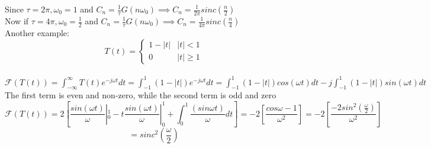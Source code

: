 \documentclass[11pt]{article}
\theoremstyle{definition}
\begin{document}
Since $\tau = 2\pi, \omega_0 = 1$ and $C_n = \frac{1}{\tau}G(n\omega_0) \implies C_n = \frac{1}{2\pi}sinc(\frac{n}{2})$\\
Now if  $\tau = 4\pi, \omega_0 = \frac{1}{2}$ and $C_n = \frac{1}{\tau}G(n\omega_0) \implies C_n = \frac{1}{4\pi}sinc(\frac{n}{4})$\\

Another example:
\[T(t) =  \begin{cases} 
      1-|t| & |t| < 1 \\
      0 & |t| \geq 1
   \end{cases}
\]\\
$\mathcal{F}(T(t)) = \int_{-\infty}^{\infty}T(t) e^{-j\omega t}dt = \int_{-1}^{1}(1-|t|) e^{-j\omega t}dt = \int_{-1}^{1}(1-|t|) cos(\omega t)dt - j\int_{-1}^{1}(1-|t|) sin(\omega t)dt$
The first term is even and non-zero, while the second term is odd and zero
$$\mathcal{F}(T(t)) = 2[\frac{sin(\omega t)}{\omega}|^1_0 -t\frac{sin(\omega t)}{\omega}|^1_0 + \int^1_0\frac{(sin\omega t)}{\omega}dt] = -2[\frac{cos\omega - 1 }{\omega^2}] = -2[\frac{-2sin^2(\frac{\omega}{2})}{\omega^2}]$$
$$= sinc^2(\frac{\omega}{2})$$\\
\end{document}
